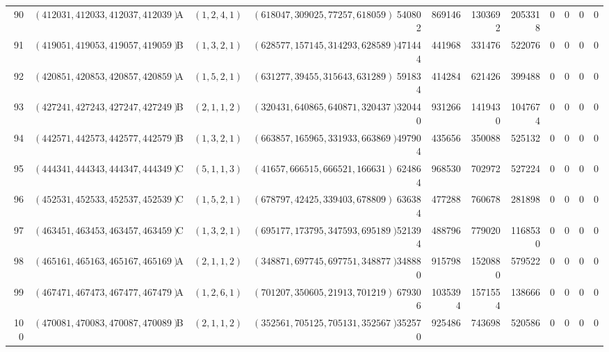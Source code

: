 \begin{longtable}{r l c l l r r r r c c c c}
90 & $(412031,412033,412037,412039)$ & A & $(1,2,4,1)$ & $(618047,309025,77257,618059)$ & 540802 & 869146 & 1303692 & 2053318 & 0 & 0 & 0 & 0\\
91 & $(419051,419053,419057,419059)$ & B & $(1,3,2,1)$ & $(628577,157145,314293,628589)$ & 471444 & 441968 & 331476 & 522076 & 0 & 0 & 0 & 0\\
92 & $(420851,420853,420857,420859)$ & A & $(1,5,2,1)$ & $(631277,39455,315643,631289)$ & 591834 & 414284 & 621426 & 399488 & 0 & 0 & 0 & 0\\
93 & $(427241,427243,427247,427249)$ & B & $(2,1,1,2)$ & $(320431,640865,640871,320437)$ & 320440 & 931266 & 1419430 & 1047674 & 0 & 0 & 0 & 0\\
94 & $(442571,442573,442577,442579)$ & B & $(1,3,2,1)$ & $(663857,165965,331933,663869)$ & 497904 & 435656 & 350088 & 525132 & 0 & 0 & 0 & 0\\
95 & $(444341,444343,444347,444349)$ & C & $(5,1,1,3)$ & $(41657,666515,666521,166631)$ & 624864 & 968530 & 702972 & 527224 & 0 & 0 & 0 & 0\\
96 & $(452531,452533,452537,452539)$ & C & $(1,5,2,1)$ & $(678797,42425,339403,678809)$ & 636384 & 477288 & 760678 & 281898 & 0 & 0 & 0 & 0\\
97 & $(463451,463453,463457,463459)$ & C & $(1,3,2,1)$ & $(695177,173795,347593,695189)$ & 521394 & 488796 & 779020 & 1168530 & 0 & 0 & 0 & 0\\
98 & $(465161,465163,465167,465169)$ & A & $(2,1,1,2)$ & $(348871,697745,697751,348877)$ & 348880 & 915798 & 1520880 & 579522 & 0 & 0 & 0 & 0\\
99 & $(467471,467473,467477,467479)$ & A & $(1,2,6,1)$ & $(701207,350605,21913,701219)$ & 679306 & 1035394 & 1571554 & 138666 & 0 & 0 & 0 & 0\\
100 & $(470081,470083,470087,470089)$ & B & $(2,1,1,2)$ & $(352561,705125,705131,352567)$ & 352570 & 925486 & 743698 & 520586 & 0 & 0 & 0 & 0\\
\bottomrule
\end{longtable}